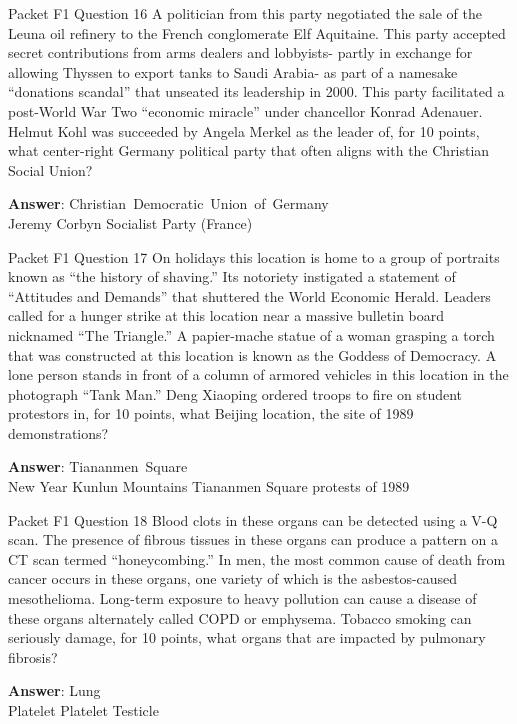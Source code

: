 \begin{frame}{Packet F1 Question 16}
A politician from this party negotiated the   sale of the Leuna oil refinery to the French conglomerate Elf Aquitaine. This party accepted secret contributions from arms dealers and lobbyists- partly in exchange for allowing Thyssen to export tanks to Saudi Arabia- as part of a namesake “donations scandal” that unseated its leadership in 2000. This party facilitated   a post-World War Two “economic miracle” under chancellor Konrad Adenauer. Helmut   Kohl was succeeded by Angela Merkel as the leader of,   for 10 points, what center-right Germany political party that often aligns with the Christian Social Union?  

\textbf{Answer}: Christian\ Democratic\ Union\ of\ Germany\\
 Jeremy Corbyn
 Socialist Party (France)
\end{frame}

\begin{frame}{Packet F1 Question 17}
On holidays this location   is home to a group of portraits known as ``the history of shaving.'' Its notoriety instigated a statement of ``Attitudes and Demands'' that shuttered the World   Economic Herald. Leaders called for a hunger strike at this location near a massive bulletin board nicknamed “The Triangle.” A papier-mache statue of a woman grasping a torch that was constructed at this location is known as the Goddess of Democracy. A lone person stands in front of a column of armored vehicles in this location in the photograph “Tank Man.” Deng Xiaoping ordered     troops to fire on student protestors in, for 10 points, what Beijing location, the site of 1989 demonstrations?  

\textbf{Answer}: Tiananmen\ Square\\
 New Year
 Kunlun Mountains
 Tiananmen Square protests of 1989
\end{frame}

\begin{frame}{Packet F1 Question 18}
Blood clots in these organs     can be detected using a V-Q scan. The presence of fibrous tissues in these organs can produce   a pattern on a CT scan termed “honeycombing.” In men, the most common cause of death from cancer occurs   in these organs, one variety of which is the asbestos-caused mesothelioma. Long-term exposure to heavy pollution can cause a disease of   these organs alternately called COPD or emphysema. Tobacco smoking can seriously damage, for 10 points, what organs that are impacted by pulmonary fibrosis?

\textbf{Answer}: Lung\\
 Platelet
 Platelet
 Testicle
\end{frame}

